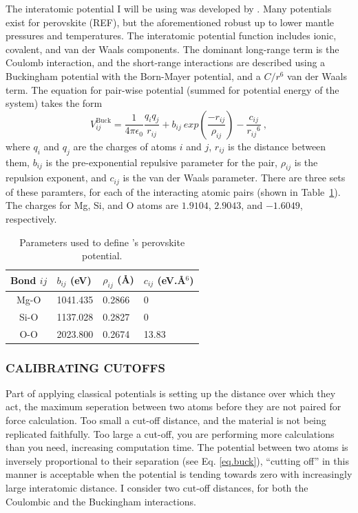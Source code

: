 The interatomic potential I will be using  was developed by \citet{Oganov2000}. Many potentials exist for \mgsios perovskite (REF), but the aforementioned robust up to lower mantle pressures and temperatures. The interatomic potential function includes ionic, covalent, and van der Waals components. The dominant long-range term is the Coulomb interaction, and the short-range interactions are described using a Buckingham potential with the Born-Mayer potential, and a $C/r^{6}$ van der Waals term. The equation for pair-wise potential (summed for potential energy of the system) takes the form
%
\begin{equation}
V_{ij}^{\mathrm{Buck}}
= \frac{1}{4 \pi \epsilon_{0}} 
\frac{q_{i} q_{j}}{r_{ij}} 
+ b_{ij}\ exp\left ( \frac{-r_{ij}}{\rho_{ij}} \right )
- \frac{c_{ij}}{{r_{ij}}^{6}} \  ,
\label{eq.buck}
\end{equation}
%
where $q_{i}$ and $q_{j}$ are the charges of atoms $i$ and $j$, $r_{ij}$ is the distance between them, $b_{ij}$ is the pre-exponential repulsive parameter for the pair, $\rho_{ij}$ is the repulsion exponent, and $c_{ij}$ is the van der Waals parameter.
There are three sets of these paramters, for each of the interacting atomic pairs (shown in Table~\ref{tab.oganov}). The charges for Mg, Si, and O atoms are $1.9104$, $2.9043$, and $-1.6049$, respectively.
%
\begin{table}[h]
\centering
\caption[CONTENTS BIT]{\label{tab.oganov}Parameters used to define \citet{Oganov2000}'s \mgsios perovskite potential.}
\begin{tabular}{clll} 
Bond $ij$ & $b_{ij}$ (eV)  & $\rho_{ij}$ (\AA) & $c_{ij}$ (eV.\AA$^{6}$) \\ \hline
Mg-O        & 1041.435        & 0.2866                 & 0                \\
Si-O          & 1137.028        & 0.2827                 & 0                \\
O-O          & 2023.800        & 0.2674                  & 13.83         \\ \hline       
\end{tabular}
\end{table}

\subsubsection{CALIBRATING CUTOFFS}

Part of applying classical potentials is setting up the distance over which they act, the maximum seperation between two atoms before they are not paired for force calculation. Too small a cut-off distance, and the material is not being replicated faithfully. Too large a cut-off, you are performing more calculations than you need, increasing computation time. The potential between two atoms is inversely proportional to their separation (see Eq. \ref{eq.buck}), ``cutting off'' in this manner is acceptable when the potential is tending towards zero with increasingly large interatomic distance. I consider two cut-off distances, for both the Coulombic and the Buckingham interactions.

